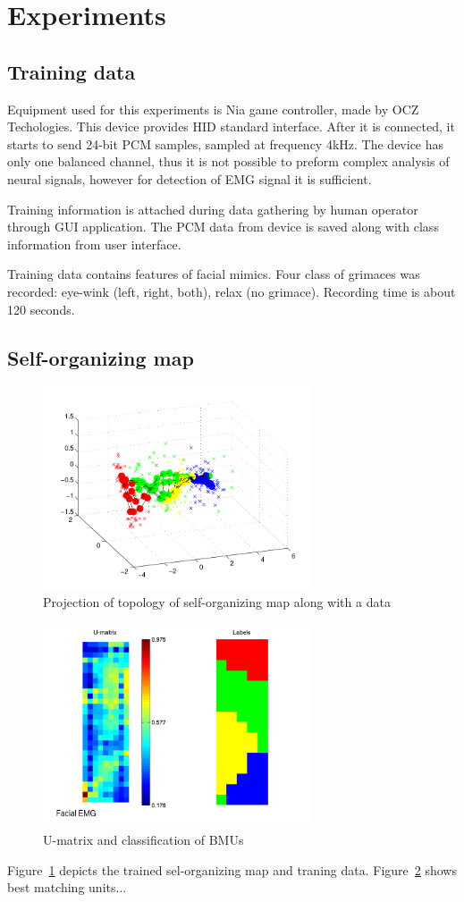 \documentclass[a4paper]{IEEEtran}
\begin{document}
\section{Experiments}
\subsection{Training data}
Equipment used for this experiments is {Nia game controller}, made by 
{OCZ Techologies}. This device provides HID standard interface.
After it is connected, it starts to send 24-bit PCM samples, 
sampled at frequency 4kHz. The device has only one balanced channel, thus 
it is not possible to preform complex analysis of neural signals,
however for detection of EMG signal it is sufficient.

Training information is attached during data gathering by human operator 
through GUI application.
The PCM data from device is saved along with class information from
user interface.

Training data contains features of facial mimics.
Four class of grimaces was recorded: eye-wink (left, right, both), 
relax (no grimace).
Recording time is about 120 seconds.

\subsection{Self-organizing map}
\begin{figure}[h]
\includegraphics[width=80mm]{som_topol_proj}
\caption{Projection of topology of self-organizing map along with a data}
\label{som_topol_proj}
\end{figure}
\begin{figure}[h]
\includegraphics[width=80mm]{som_umat}
\caption{U-matrix and classification of BMUs}
\label{som_umat}
\end{figure}
Figure~\ref{som_topol_proj} depicts the trained sel-organizing map and 
traning data.
Figure~\ref{som_umat} shows best matching units...
\end{document}
